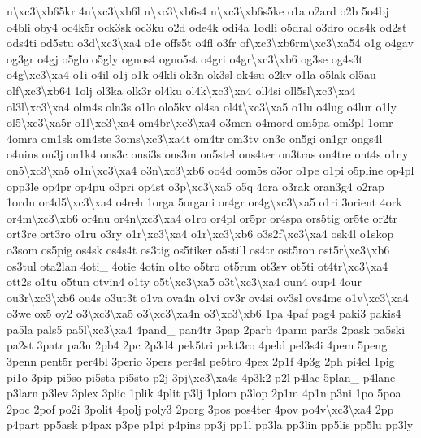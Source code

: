 \begin{DoxyCompactItemize}
n\textbackslash{}xc3\textbackslash{}xb65kr 4n\textbackslash{}xc3\textbackslash{}xb6l n\textbackslash{}xc3\textbackslash{}xb6s4 n\textbackslash{}xc3\textbackslash{}xb6s5ke o1a o2ard o2b 5o4bj o4bli oby4 oc4k5r ock3sk oc3ku o2d ode4k odi4a 1odli o5dral o3dro ods4k od2st ods4ti od5stu o3d\textbackslash{}xc3\textbackslash{}xa4 o1e offs5t o4fl o3fr of\textbackslash{}xc3\textbackslash{}xb6rm\textbackslash{}xc3\textbackslash{}xa54 o1g o4gav og3gr o4gj o5glo o5gly ognos4 ogno5st o4gri o4gr\textbackslash{}xc3\textbackslash{}xb6 og3se og4s3t o4g\textbackslash{}xc3\textbackslash{}xa4 o1i o4il o1j o1k o4kli ok3n ok3sl ok4su o2kv o1la o5lak ol5au olf\textbackslash{}xc3\textbackslash{}xb64 1olj ol3ka olk3r ol4ku ol4k\textbackslash{}xc3\textbackslash{}xa4 oll4si oll5sl\textbackslash{}xc3\textbackslash{}xa4 ol3l\textbackslash{}xc3\textbackslash{}xa4 olm4s oln3s o1lo olo5kv ol4sa ol4t\textbackslash{}xc3\textbackslash{}xa5 o1lu o4lug o4lur o1ly ol5\textbackslash{}xc3\textbackslash{}xa5r o1l\textbackslash{}xc3\textbackslash{}xa4 om4br\textbackslash{}xc3\textbackslash{}xa4 o3men o4mord om5pa om3pl 1omr 4omra om1sk om4ste 3oms\textbackslash{}xc3\textbackslash{}xa4t om4tr om3tv on3c on5gi on1gr ongs4l o4nins on3j on1k4 ons3c onsi3s ons3m on5stel ons4ter on3tras on4tre ont4s o1ny on5\textbackslash{}xc3\textbackslash{}xa5 o1n\textbackslash{}xc3\textbackslash{}xa4 o3n\textbackslash{}xc3\textbackslash{}xb6 oo4d oom5s o3or o1pe o1pi o5pline op4pl opp3le op4pr op4pu o3pri op4st o3p\textbackslash{}xc3\textbackslash{}xa5 o5q 4ora o3rak oran3g4 o2rap 1ordn or4d5\textbackslash{}xc3\textbackslash{}xa4 o4reh 1orga 5organi or4gr or4g\textbackslash{}xc3\textbackslash{}xa5 o1ri 3orient 4ork or4m\textbackslash{}xc3\textbackslash{}xb6 or4nu or4n\textbackslash{}xc3\textbackslash{}xa4 o1ro or4pl or5pr or4spa ors5tig or5te or2tr ort3re ort3ro o1ru o3ry o1r\textbackslash{}xc3\textbackslash{}xa4 o1r\textbackslash{}xc3\textbackslash{}xb6 o3s2f\textbackslash{}xc3\textbackslash{}xa4 osk4l o1skop o3som os5pig os4sk os4s4t os3tig os5tiker o5still os4tr ost5ron ost5r\textbackslash{}xc3\textbackslash{}xb6 os3tul ota2lan 4oti\-\_\- 4otie 4otin o1to o5tro ot5run ot3sv ot5ti ot4tr\textbackslash{}xc3\textbackslash{}xa4 ott2s o1tu o5tun otvin4 o1ty o5t\textbackslash{}xc3\textbackslash{}xa5 o3t\textbackslash{}xc3\textbackslash{}xa4 oun4 oup4 4our ou3r\textbackslash{}xc3\textbackslash{}xb6 ou4s o3ut3t o1va ova4n o1vi ov3r ov4si ov3sl ovs4me o1v\textbackslash{}xc3\textbackslash{}xa4 o3we ox5 oy2 o3\textbackslash{}xc3\textbackslash{}xa5 o3\textbackslash{}xc3\textbackslash{}xa4n o3\textbackslash{}xc3\textbackslash{}xb6 1pa 4paf pag4 paki3 pakis4 pa5la pals5 pa5l\textbackslash{}xc3\textbackslash{}xa4 4pand\-\_\- pan4tr 3pap 2parb 4parm par3s 2pask pa5ski pa2st 3patr pa3u 2pb4 2pc 2p3d4 pek5tri pekt3ro 4peld pel3s4i 4pem 5peng 3penn pent5r per4bl 3perio 3pers per4sl pe5tro 4pex 2p1f 4p3g 2ph pi4el 1pig pi1o 3pip pi5so pi5sta pi5sto p2j 3pj\textbackslash{}xc3\textbackslash{}xa4s 4p3k2 p2l p4lac 5plan\-\_\- p4lane p3larn p3lev 3plex 3plic 1plik 4plit p3lj 1plom p3lop 2p1m 4p1n p3ni 1po 5poa 2poc 2pof po2i 3polit 4polj poly3 2porg 3pos pos4ter 4pov po4v\textbackslash{}xc3\textbackslash{}xa4 2pp p4part pp5ask p4pax p3pe p1pi p4pins pp3j pp1l pp3la pp3lin pp5lis pp5lu pp3ly 
\end{DoxyCompactItemize}
